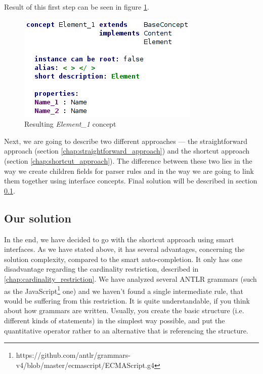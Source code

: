 Result of this first step can be seen in figure \ref{fig:element_concept_common}.

\begin{figure}[h]
	\centering
	\includegraphics[scale=0.7]{./img/element_concept_common.png}
	\caption{Resulting \textit{Element{\_}1} concept}
	\label{fig:element_concept_common}
\end{figure}

Next, we are going to describe two different approaches --- the straightforward approach (section \ref{chap:straightforward_approach}) and the shortcut approach (section \ref{chap:shortcut_approach}).
The difference between these two lies in the way we create children fields for parser rules and in the way we are going to link them together using interface concepts.
Final solution will be described in section \ref{chap:structure_solution}.

\pagebreak



\pagebreak



\pagebreak

\subsection{Our solution}
\label{chap:structure_solution}

In the end, we have decided to go with the shortcut approach using smart interfaces.
As we have stated above, it has several advantages, concerning the solution complexity, compared to the smart auto-completion.
It only has one disadvantage regarding the cardinality restriction, described in \ref{chap:cardinality_restriction}.
We have analyzed several ANTLR grammars (such as the JavaScript\footnote{https://github.com/antlr/grammars-v4/blob/master/ecmascript/ECMAScript.g4} one) and we haven't found a single intermediate rule, that would be suffering from this restriction.
It is quite understandable, if you think about how grammars are written.
Usually, you create the basic structure (i.e. different kinds of statements) in the simplest way possible, and put the quantitative operator rather to an alternative that is referencing the structure.
\\


